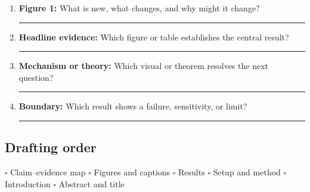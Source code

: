 \begin{enumerate}[leftmargin=*]
    \item \textbf{Figure 1:} What is new, what changes, and why might it change?

    \vspace{0.35cm}\hrule\vspace{0.3cm}

    \item \textbf{Headline evidence:} Which figure or table establishes the
    central result?

    \vspace{0.35cm}\hrule\vspace{0.3cm}

    \item \textbf{Mechanism or theory:} Which visual or theorem resolves the
    next question?

    \vspace{0.35cm}\hrule\vspace{0.3cm}

    \item \textbf{Boundary:} Which result shows a failure, sensitivity, or
    limit?

    \vspace{0.35cm}\hrule
\end{enumerate}

\subsection{Drafting order}

\noindent
\(\square\) Claim--evidence map \quad
\(\square\) Figures and captions \quad
\(\square\) Results \quad
\(\square\) Setup and method \quad
\(\square\) Introduction \quad
\(\square\) Abstract and title

